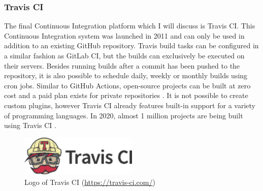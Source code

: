 
\subsubsection{Travis CI}
The final Continuous Integration platform which I will discuss is Travis CI. This Continuous Integration system was launched in 2011 and can only be used in addition to an existing GitHub repository. Travis build tasks can be configured in a similar fashion as GitLab CI, but the builds can exclusively be executed on their servers. Besides running builds after a commit has been pushed to the repository, it is also possible to schedule daily, weekly or monthly builds using cron jobs. Similar to GitHub Actions, open-source projects can be built at zero cost and a paid plan exists for private repositories \cite{travisanalysis}. It is not possible to create custom plugins, however Travis CI already features built-in support for a variety of programming languages. In 2020, almost 1 million projects are being built using Travis CI \cite{travis2020}.

\begin{figure}[htbp!]
	\centering
	\includegraphics[width=0.5\textwidth]{assets/travis-ci.pdf}
	\caption{Logo of Travis CI (\url{https://travis-ci.com/})}
	\label{fig:travis-ci}
\end{figure}

